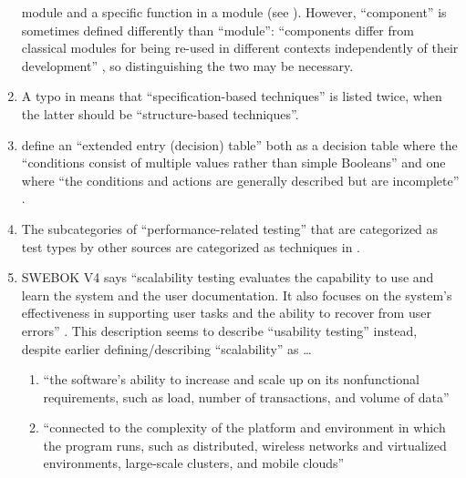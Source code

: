\begin{enumerate}
            module and a specific function in a module (see ).
            However, ``component'' is sometimes defined differently than
            ``module'': ``components differ from classical modules for being
            re-used in different contexts independently of their development''
            \citep[p.~107]{BaresiAndPezzè2006}, so distinguishing the two
            may be necessary.
      \item A typo in \citep[Fig.~2]{IEEE2021} means that ``specification-based
            techniques'' is listed twice, when the latter should be
            ``structure-based techniques''.
      \item \citeauthor{IEEE2021} define an ``extended entry (decision) table''
            both as a decision table where the ``conditions consist of multiple
            values rather than simple Booleans'' \citeyearpar[p.~18]{IEEE2021}
            and one where ``the conditions and actions are generally described
            but are incomplete'' \citeyearpar[p.~175]{IEEE2017} .
      \item The subcategories of ``performance-related testing'' that are
            categorized as test types by other sources \citep{IEEE2022, IEEE2017,
                  IEEE2013} are categorized as techniques in
            \citeyearpar[p.~39]{IEEE2021}.
      \item SWEBOK V4 says ``scalability testing evaluates the capability to
            use and learn the system and the user documentation. It also focuses
            on the system's effectiveness in supporting user tasks and the
            ability to recover from user errors'' \citep[p.~5-9]{SWEBOK2024}.
            This description seems to describe ``usability testing'' instead,
            despite earlier defining/describing ``scalability'' as \ldots
            \begin{enumerate}
                  \item ``the software's ability to increase and scale up on its
                        nonfunctional requirements, such as load, number of
                        transactions, and volume of data'' \citep[p.~5-5]{SWEBOK2024}
                  \item ``connected to the complexity of the platform and
                        environment in which the program runs, such as
                        distributed, wireless networks and virtualized
                        environments, large-scale clusters, and mobile clouds''

\end{enumerate}
\end{enumerate}
